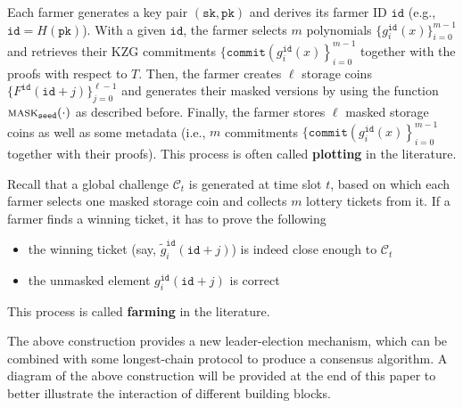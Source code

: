 \documentclass[conference]{IEEEtran}
\newcommand{\sk}{\texttt{sk}}
\newcommand{\pk}{\texttt{pk}}
\newcommand{\id}{\texttt{id}}
\newcommand{\seed}{\texttt{seed}}
\newcommand{\cmt}{\texttt{commit}}
\newcommand{\mask}{\textsc{mask}}
\begin{document}
Each farmer generates a key pair $(\sk, \pk)$ and derives its farmer ID $\id$ (e.g., $\id = H(\pk)$).
With a given $\id$, the farmer selects $m$ polynomials $\{g_i^{\id}(x) \}_{i = 0}^{m - 1}$ and retrieves their KZG commitments $\{\cmt\left(g_i^{\id}(x) \right \}_{i = 0}^{m - 1}$
together with the proofs with respect to $T$. Then, the farmer creates $\ell$ storage coins 
$\{ F^{\id}(\id + j) \}_{j = 0}^{\ell - 1}$ and generates their masked versions by using the function $\mask_{\seed}(\cdot)$ as described before.
Finally, the farmer stores $\ell$ masked storage coins as well as some metadata (i.e., $m$ commitments $\{\cmt\left(g_i^{\id}(x) \right \}_{i = 0}^{m - 1}$ together with their proofs).
This process is often called {\bf plotting} in the literature.

Recall that a global challenge $\mathcal{C}_t$ is generated at time slot $t$, based on which each farmer selects one masked storage coin and collects $m$ lottery tickets from it. If a farmer finds a winning ticket, it has to prove the following
\begin{itemize}
    \item the winning ticket (say, $\tilde{g}_i^{\id}(\id + j)$) is indeed close enough to $\mathcal{C}_t$
    \item the unmasked element ${g}_i^{\id}(\id + j)$ is correct
\end{itemize}
This process is called {\bf farming} in the literature. 

The above construction provides a new leader-election mechanism, which can be combined with some longest-chain protocol to produce a consensus algorithm.
A diagram of the above construction will be provided at the end of this paper to better illustrate the interaction of different building blocks.

\end{document}
